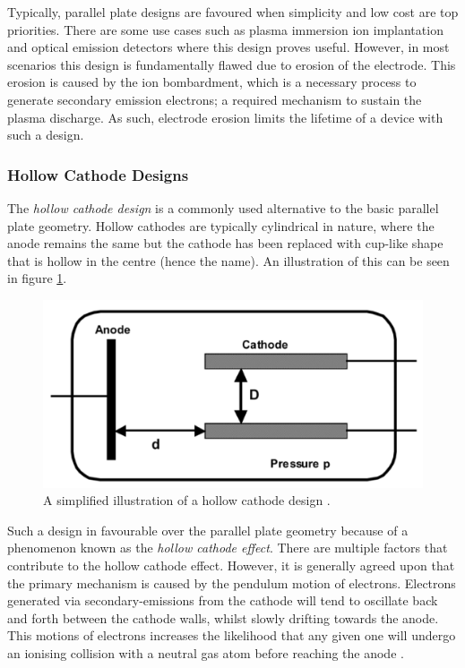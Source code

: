 Typically, parallel plate designs are favoured when simplicity and low cost are top priorities. There are some use cases such as plasma immersion ion implantation \cite{Ueda1999} and optical emission detectors \cite{Eijkel1999} where this design proves useful. However, in most scenarios this design is fundamentally flawed due to erosion of the electrode. This erosion is caused by the ion bombardment, which is a necessary process to generate secondary emission electrons; a required mechanism to sustain the plasma discharge. As such, electrode erosion limits the lifetime of a device with such a design.   

\subsubsection{Hollow Cathode Designs}

The \textit{hollow cathode design} is a commonly used alternative to the basic parallel plate geometry. Hollow cathodes are typically cylindrical in nature, where the anode remains the same but the cathode has been replaced with cup-like shape that is hollow in the centre (hence the name). An illustration of this can be seen in figure \ref{fig:hollow_cathode_design}. 

\begin{figure}[h!]
	\centering
	\includegraphics[width=0.6\linewidth]{chapter_2/figures/hollow_cathode_illustration.png}
	\caption{A simplified illustration of a hollow cathode design \cite{Becker2006}.}
	\label{fig:hollow_cathode_design}
\end{figure}
 
 Such a design in favourable over the parallel plate geometry because of a phenomenon known as the \textit{hollow cathode effect}. There are multiple factors that contribute to the hollow cathode effect. However, it is generally agreed upon that the primary mechanism is caused by the pendulum motion of electrons. Electrons generated via secondary-emissions from the cathode will tend to oscillate back and forth between the cathode walls, whilst slowly drifting towards the anode. This motions of electrons increases the likelihood that any given one will undergo an ionising collision with a neutral gas atom before reaching the anode \cite{Arslanbekov1998}.
 
